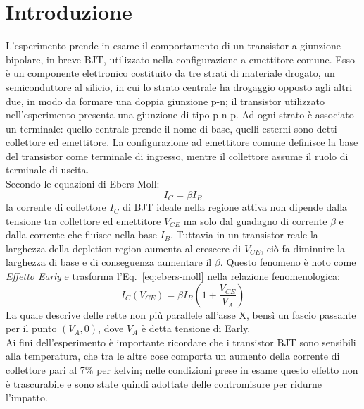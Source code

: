 \documentclass[../main.tex]{subfiles}
\begin{document}
    \section{Introduzione} \label{sec:introduzione}

    L'esperimento prende in esame il comportamento di un transistor a giunzione bipolare,
    in breve BJT, utilizzato nella configurazione a emettitore comune.
    Esso è un componente elettronico costituito da tre strati di materiale drogato,
    un semiconduttore al silicio, in cui lo strato centrale ha drogaggio opposto agli
    altri due, in modo da formare una doppia giunzione p-n; il transistor
    utilizzato nell'esperimento presenta una giunzione di tipo p-n-p.
    Ad ogni strato è associato un terminale: quello centrale prende il nome di base,
    quelli esterni sono detti collettore ed emettitore.
    La configurazione ad emettitore comune definisce la base del transistor come
    terminale di ingresso, mentre il collettore assume il ruolo di terminale di uscita.\\

    Secondo le equazioni di Ebers-Moll:
    \begin{equation}
        I_C = \beta I_B
        \label{eq:ebers-moll}
    \end{equation}
    la corrente di collettore $I_C$ di BJT ideale nella regione
    attiva non dipende dalla tensione tra collettore ed
    emettitore $V_{CE}$ ma solo dal guadagno di corrente $\beta$ e
    dalla corrente che fluisce nella base $I_B$.
    Tuttavia in un transistor reale la larghezza della depletion
    region aumenta al crescere di $V_{CE}$, ciò fa diminuire la
    larghezza di base e di conseguenza aumentare il $\beta$.
    Questo fenomeno è noto come \textit{Effetto Early} e trasforma
    l'Eq.~\eqref{eq:ebers-moll} nella relazione fenomenologica:
    \begin{equation}
        I_C(V_{CE}) = \beta I_B \left( 1 + \frac{V_{CE}}{V_A} \right)
        \label{eq:early}
    \end{equation}
    La quale descrive delle rette non più parallele all'asse X,
    bensì un fascio passante per il punto $(V_A, 0)$, dove $V_A$
    è detta tensione di Early.\\

    Ai fini dell'esperimento è importante ricordare che i transistor BJT sono sensibili
    alla temperatura, che tra le altre cose comporta un aumento della
    corrente di collettore pari al 7\% per kelvin; nelle condizioni prese in esame
    questo effetto non è trascurabile e sono state quindi adottate delle contromisure per
    ridurne l'impatto.\\
\end{document}
